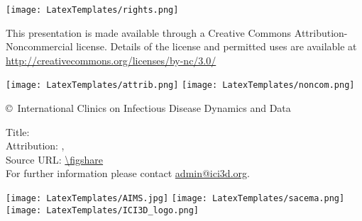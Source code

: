 
\begin{frame}[plain]

\begin{centering}

\texttt{[image: LatexTemplates/rights.png]}

\vfill

{
	\tiny\linespread{12}
	This presentation is made available through a Creative Commons Attribution-Noncommercial license.
	Details of the license and permitted uses are available at \url{http://creativecommons.org/licenses/by-nc/3.0/} \par
}

\medskip
\texttt{[image: LatexTemplates/attrib.png]}
\hspace{3em}
\texttt{[image: LatexTemplates/noncom.png]}
\medskip

{\scriptsize\copyright\years\ International Clinics on Infectious Disease Dynamics and Data}

\vfill

Title: \inserttitle \\
{\footnotesize
	Attribution: \insertauthor, \insertdate \\
	{\scriptsize Source URL: \url{\figshare}} \\
	For further information please contact \url{admin@ici3d.org}.
}

\vfill

\texttt{[image: LatexTemplates/AIMS.jpg]}
\hfill
\texttt{[image: LatexTemplates/sacema.png]}
\hfill
\texttt{[image: LatexTemplates/ICI3D\_logo.png]}

\end{centering}

\end{frame}
